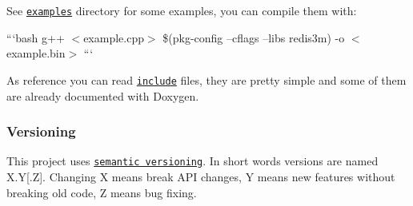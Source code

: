 See \href{https://github.com/luca3m/redis3m/tree/master/examples}{\tt examples} directory for some examples, you can compile them with\-:

```bash g++ $<$example.\-cpp$>$ \$(pkg-\/config --cflags --libs redis3m) -\/o $<$example.\-bin$>$ ```

As reference you can read \href{https://github.com/luca3m/redis3m/tree/master/include}{\tt include} files, they are pretty simple and some of them are already documented with Doxygen.

\subsubsection*{Versioning}

This project uses \href{http://semver.org}{\tt semantic versioning}. In short words versions are named X.\-Y\mbox{[}.Z\mbox{]}. Changing X means break A\-P\-I changes, Y means new features without breaking old code, Z means bug fixing. 